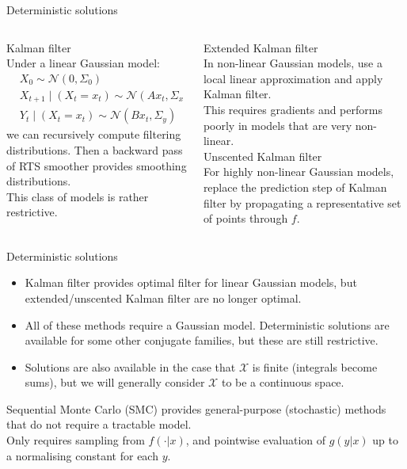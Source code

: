 \documentclass[aspectratio=169]{beamer}
\theoremstyle{definition}
\newcommand{\N}{\mathcal{N}}
\begin{document}
\begin{frame}{Deterministic solutions}
\begin{columns}
\begin{column}{0.45\textwidth}
{\Large Kalman filter \cite{kalman1960}}\\
Under a linear Gaussian model:
\begin{align*}
& X_0 \sim \N(0, \Sigma_0) \\
& X_{t+1} \mid (X_t = x_t) \sim \N(A x_t, \Sigma_x) \\
& Y_t \mid (X_t = x_t) \sim \N(B x_t, \Sigma_y)
\end{align*}
we can recursively compute filtering distributions. 
Then a backward pass of RTS smoother \cite{rauch1965} provides smoothing distributions.\\[7pt]
This class of models is rather restrictive.
\end{column}

\begin{column}{0.45\textwidth}
{\Large Extended Kalman filter \cite{jazwinski2007}}\\
In non-linear Gaussian models, use a local linear approximation and apply Kalman filter.\\[7pt]
This requires gradients and performs poorly in models that are very non-linear.\\[12pt]

{\Large Unscented Kalman filter \cite{wan2000}}\\
For highly non-linear Gaussian models, replace the prediction step of Kalman filter by propagating a representative set of points through $f$.
\end{column}
\end{columns}
\end{frame}

\begin{frame}{Deterministic solutions}
\begin{itemize}
\item Kalman filter provides optimal filter for linear Gaussian models, but extended/unscented Kalman filter are no longer optimal.\\[7pt] %

\item All of these methods require a Gaussian model.
Deterministic solutions are available for some other conjugate families, but these are still restrictive. \\[7pt]

\item Solutions are also available in the case that $\mathcal{X}$ is finite (integrals become sums), but we will generally consider $\mathcal{X}$ to be a continuous space. \\[7pt]
\end{itemize}

Sequential Monte Carlo (SMC) provides general-purpose (stochastic) methods that do not require a tractable model.\\[7pt]
 
Only requires sampling from $f(\cdot | x)$, and pointwise evaluation of $g(y | x)$ up to a normalising constant for each $y$.
\end{frame}
\end{document}
